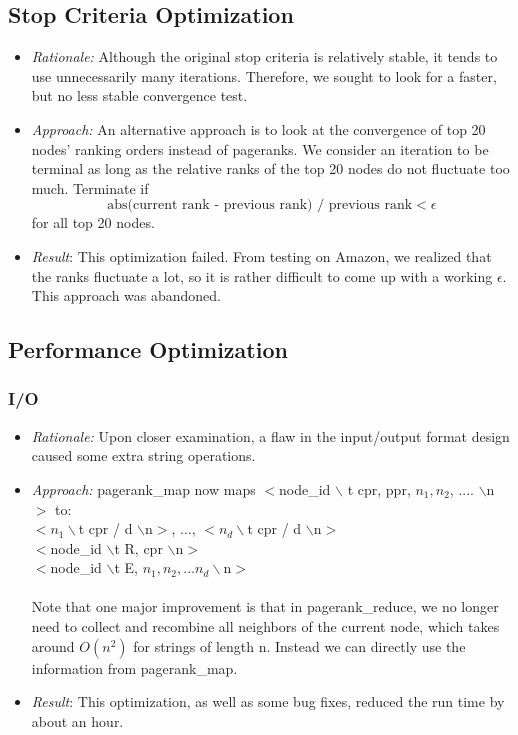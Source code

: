 \documentclass[12pt]{article}
\begin{document}
\subsection{Stop Criteria Optimization}
\begin{itemize}
\item \emph{Rationale:} Although the original stop criteria is  relatively stable, it tends to use unnecessarily many iterations. Therefore, we sought to look for a faster, but no less stable convergence test. 
\item \emph{Approach:}
An alternative approach  is to look at the convergence of top 20 nodes' ranking orders instead of pageranks. We consider an iteration to be terminal as long as the relative ranks of the top 20 nodes do not fluctuate too much. Terminate  if \[\text{abs(current rank - previous rank) / previous rank} <\epsilon\] for all top 20 nodes. 
\item \emph{Result}: 
This optimization failed. From testing on Amazon, we realized that the ranks fluctuate a lot, so it is rather difficult to come up with a working $\epsilon$. This approach was abandoned.
\end{itemize}


\subsection{Performance Optimization}
\subsubsection{I/O}
\begin{itemize}
\item \emph{Rationale:} Upon closer examination, a flaw in the input/output format design caused some extra string operations. 
\item \emph{Approach:} 
pagerank\_map now maps $<$node\_id $\backslash$ t cpr, ppr, $n_1, n_2$, .... $\backslash$n$>$ to:\\
$<n_1 \backslash$t  cpr / d $\backslash$n$>$,  ..., $<n_d \backslash$t  cpr / d  $\backslash$n$>$ \\
$<$node\_id $\backslash$t R, cpr $\backslash$n$>$\\
$<$node\_id $\backslash$t E, $n_1, n_2, ... n_d\backslash$n$>$\\\\
Note that one major improvement is that in pagerank\_reduce, we no longer need to collect and recombine all neighbors of the current node, which takes around $O(n^2)$ for strings of length n.  Instead we can directly use the information from pagerank\_map.  
\item \emph{Result}:
This optimization, as well as some bug fixes, reduced the run time by about an hour.
\end{itemize}
\end{document}
